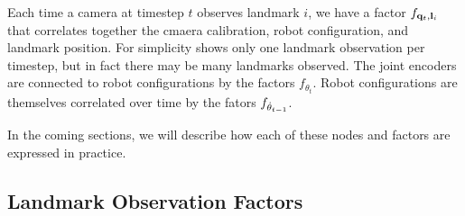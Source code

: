 Each time a camera at timestep $t$ observes landmark $i$, we have a factor $f_{\mathbf{q}_t, \mathbf{l}_i}$ that correlates together the cmaera calibration, robot configuration, and landmark position. For simplicity  shows only one landmark observation per timestep, but in fact there may be many landmarks observed. The joint encoders are connected to robot configurations by the factors $f_{\theta_t}$. Robot configurations are themselves correlated over time by the fators $f_{\dot{\theta}_{t-1}}$. 

In the coming sections, we will describe how each of these nodes and factors are expressed in practice.

\subsection{Landmark Observation Factors}

